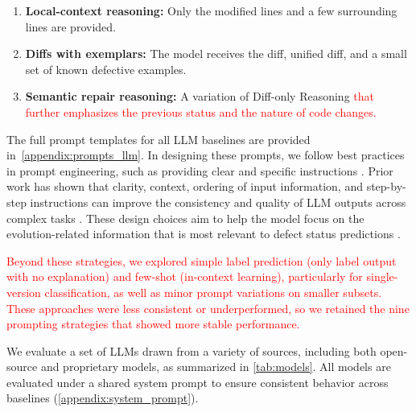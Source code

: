 \documentclass[authoryear,final,5p,times,twocolumn]{elsarticle}
\theoremstyle{plain}
\begin{document}
\begin{enumerate}
\begin{figure}[ht]
\begin{promptbox}
\textless added/removed lines\textgreater

[Unified diff]
\textless patch-style diff\textgreater

Use this information to infer the status of SRC2.
\end{promptbox}
\caption{Prompt for Diff-only Reasoning.}
\label{fig:prompt_m5}
\end{figure}

\item \textbf{Local-context reasoning:} 
Only the modified lines and a few surrounding lines are provided.

\item \textbf{Diffs with exemplars:} 
The model receives the diff, unified diff, and a small set of known defective examples.

\item \textbf{Semantic repair reasoning:} 
A variation of Diff-only Reasoning \textcolor{red}{that further emphasizes the previous status and the nature of code changes.}
\end{enumerate}

The full prompt templates for all LLM baselines are provided in~\ref{appendix:prompts_llm}.
In designing these prompts, we follow best practices in prompt engineering, such as providing clear and specific instructions \citep{wei2022chain}. 
Prior work has shown that clarity, context, ordering of input information, and step-by-step instructions can improve the consistency and quality of LLM outputs across complex tasks \citep{white2023prompt}. 
These design choices aim to help the model focus on the evolution-related information that is most relevant to defect status predictions \citep{liu2023pre}.

\textcolor{red}{Beyond these strategies, we explored simple label prediction (only label output with no explanation) and few-shot (in-context learning), particularly for single-version classification, as well as minor prompt variations on smaller subsets. These approaches were less consistent or underperformed, so we retained the nine prompting strategies that showed more stable performance.}

We evaluate a set of LLMs drawn from a variety of sources, including both open-source and proprietary models, as summarized in \autoref{tab:models}. All models are evaluated under a shared system prompt to ensure consistent behavior across baselines (\ref{appendix:system_prompt}).
\end{document}
